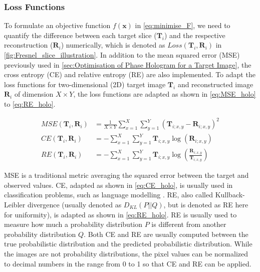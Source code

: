 \subsubsection{Loss Functions}
To formulate an objective function $f(\textbf{x})$ in \cref{eq:minimise_F}, we need to quantify the difference between each target slice ($\textbf{T}_i$) and the respective reconstruction ($\textbf{R}_i$) numerically, which is denoted as $Loss(\textbf{T}_i, \textbf{R}_i)$ in \cref{fig:Fresnel_slice_illustration}. In addition to the mean squared error (MSE) \cite{MSE_REF} previously used in \cref{sec:Optimisation of Phase Hologram for a Target Image}, the cross entropy (CE) \cite{cybenko1998mathematics} and relative entropy (RE) \cite{Kullback1951} are also implemented. To adapt the loss functions for two-dimensional (2D) target image $\textbf{T}_i$ and reconstructed image $\textbf{R}_i$ of dimension $X\times Y$, the loss functions are adapted as shown in \cref{eq:MSE_holo} to \cref{eq:RE_holo}.

\begin{align}
	MSE(\textbf{T}_i, \textbf{R}_i) & = \frac{1}{X\times Y} \sum_{x=1}^{X} \sum_{y=1}^{Y} (\textbf{T}_{i;x,y}-\textbf{R}_{i;x,y})^2\label{eq:MSE_holo}                     \\
	CE(\textbf{T}_i, \textbf{R}_i)  & = -\sum_{x=1}^{X} \sum_{y=1}^{Y} \textbf{T}_{i;x,y}\log(\textbf{R}_{i;x,y})\label{eq:CE_holo}                                        \\
	RE(\textbf{T}_i, \textbf{R}_i)  & = -\sum_{x=1}^{X} \sum_{y=1}^{Y} \textbf{T}_{i;x,y}\log\left(\frac{\textbf{R}_{i;x,y}}{\textbf{T}_{i;x,y}}\right) \label{eq:RE_holo}
\end{align}

MSE is a traditional metric averaging the squared error between the target and observed values. CE, adapted as shown in \cref{eq:CE_holo}, is usually used in classification problems, such as language modelling \cite{Liu2018}. RE, also called Kullback-Leibler divergence (usually denoted as $D_{KL}(P\vert\vert Q)$, but is denoted as RE here for uniformity), is adapted as shown in \cref{eq:RE_holo}. RE is usually used to measure how much a probability distribution $P$ is different from another probability distribution $Q$. Both CE and RE are usually computed between the true probabilistic distribution and the predicted probabilistic distribution. While the images are not probability distributions, the pixel values can be normalized to decimal numbers in the range from 0 to 1 so that CE and RE can be applied.

